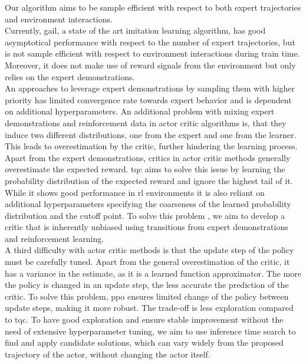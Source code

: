 Our algorithm aims to be sample efficient with respect to both expert trajectories and environment interactions. \\

Currently, \ac{gail}, a state of the art imitation learning algorithm, has good asymptotical performance with respect to the number of expert trajectories, but is not sample efficient 
with respect to environment interactions during train time. Moreover, it does not make use of reward signals from the environment but only relies on the expert demonstrations.\\ 

An approaches to leverage expert demonstrations by sampling them with higher priority \cite{vecerik2018leveraging} has limited convergence rate towards expert behavior and is dependent on additional hyperparameters. 
An additional problem with mixing expert demonstrations and reinforcement data in actor critic algorithms is, that they induce two different distributions, one from the expert and one from 
the learner. This leads to overestimation by the critic, further hindering the learning process. \\

Apart from the expert demonstrations, critics in actor critic methods generally overestimate the expected reward. \ac{tqc} \cite{TQC_Paper} aims to solve this issue by learning the 
probability distribution of the expected reward and ignore the highest tail of it. While it shows good performance in \ac{rl} environments 
it is also reliant on additional hyperparameters 
specifying the coarseness of the learned probability distribution and the cutoff point. To solve this problem , we aim to develop a critic that is inherently unbiased using transitions from expert demonstrations 
and reinforcement learning.\\

A third difficulty with actor critic methods is that the update step of the policy must be carefully tuned. Apart from the general overestimation of the critic, it has a variance in the estimate, 
as it is a learned function approximator. The more the policy is changed in an update step, the less accurate the prediction of the critic. To solve this problem, \ac{ppo} ensures limited change of the policy 
between update steps, making it more robust. The trade-off is less exploration compared to \ac{tqc}. To have good exploration 
and ensure stable improvement without the need of extensive hyperparameter tuning, we aim to use inference time search to find and apply candidate solutions, which can vary widely from the 
proposed trajectory of the actor, without changing the actor itself. \\

